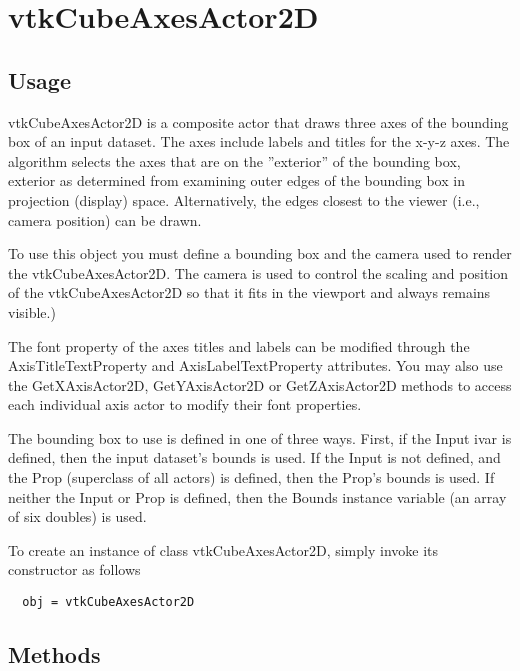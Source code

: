 \section{vtkCubeAxesActor2D}

\subsection{Usage}

 vtkCubeAxesActor2D is a composite actor that draws three axes of the 
 bounding box of an input dataset. The axes include labels and titles
 for the x-y-z axes. The algorithm selects the axes that are on the 
 ''exterior'' of the bounding box, exterior as determined from examining
 outer edges of the bounding box in projection (display) space. Alternatively,
 the edges closest to the viewer (i.e., camera position) can be drawn.
 
 To use this object you must define a bounding box and the camera used
 to render the vtkCubeAxesActor2D. The camera is used to control the 
 scaling and position of the vtkCubeAxesActor2D so that it fits in the
 viewport and always remains visible.)

 The font property of the axes titles and labels can be modified through the
 AxisTitleTextProperty and AxisLabelTextProperty attributes. You may also
 use the GetXAxisActor2D, GetYAxisActor2D or GetZAxisActor2D methods 
 to access each individual axis actor to modify their font properties.

 The bounding box to use is defined in one of three ways. First, if the Input
 ivar is defined, then the input dataset's bounds is used. If the Input is 
 not defined, and the Prop (superclass of all actors) is defined, then the
 Prop's bounds is used. If neither the Input or Prop is defined, then the
 Bounds instance variable (an array of six doubles) is used.
 

To create an instance of class vtkCubeAxesActor2D, simply
invoke its constructor as follows
\begin{verbatim}
  obj = vtkCubeAxesActor2D
\end{verbatim}
\subsection{Methods}

